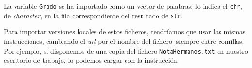 \documentclass[
]{book}
\newenvironment{Shaded}{\begin{snugshade}}{\end{snugshade}}
\newcommand{\CommentTok}[1]{\textcolor[rgb]{0.56,0.35,0.01}{\textit{#1}}}
\newcommand{\DataTypeTok}[1]{\textcolor[rgb]{0.13,0.29,0.53}{#1}}
\newcommand{\KeywordTok}[1]{\textcolor[rgb]{0.13,0.29,0.53}{\textbf{#1}}}
\newcommand{\NormalTok}[1]{#1}
\newcommand{\OtherTok}[1]{\textcolor[rgb]{0.56,0.35,0.01}{#1}}
\newcommand{\StringTok}[1]{\textcolor[rgb]{0.31,0.60,0.02}{#1}}
\theoremstyle{definition}
\theoremstyle{definition}
\theoremstyle{definition}
\theoremstyle{remark}
\begin{document}
La variable \texttt{Grado} se ha importado como un vector de palabras: lo indica el \texttt{chr}, de \emph{character}, en la fila correspondiente del resultado de \texttt{str}.

Para importar versiones locales de estos ficheros, tendríamos que usar las mismas instrucciones, cambiando el \emph{url} por el nombre del fichero, siempre entre comillas. Por ejemplo, si disponemos de una copia del fichero \texttt{NotaHermanos.txt} en nuestro escritorio de trabajo, lo podemos cargar con la instrucción:

\begin{Shaded}
\end{Shaded}
\end{document}
